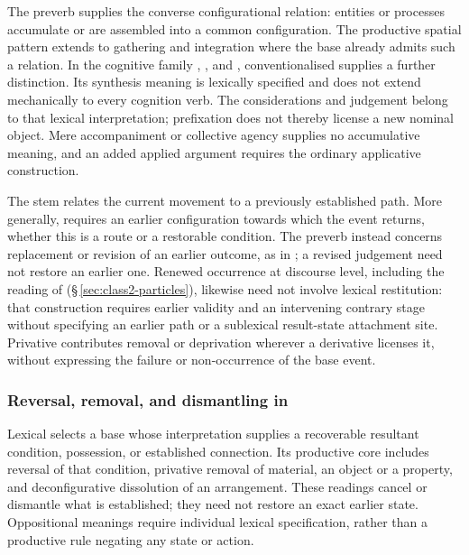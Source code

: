 The preverb  supplies the converse configurational relation: entities
or processes accumulate or are assembled into a common configuration. The productive spatial
pattern extends to gathering and integration where the base already admits
such a relation. In the cognitive family  ,
 , and 
, conventionalised 
 supplies a
further distinction. Its synthesis meaning is lexically specified and does not
extend mechanically to every cognition verb. The considerations and judgement
belong to that lexical interpretation; prefixation does not thereby license a
new nominal object. Mere accompaniment or collective agency supplies no
accumulative meaning, and an added applied argument requires the ordinary
applicative construction.

The stem   relates the current
movement to a previously established path. More generally,  requires an
earlier configuration towards which the event returns, whether this is a route
or a restorable condition. The preverb  instead concerns
replacement or revision of an earlier outcome, as in ; a revised judgement need not
restore an earlier one. Renewed occurrence at discourse level, including the
reading of  (§\,\ref{sec:class2-particles}), likewise need not
involve lexical restitution: that construction requires earlier validity
and an intervening contrary stage without specifying an earlier path or a
sublexical result-state attachment site. Privative  contributes removal or
deprivation wherever a derivative licenses it, without expressing the failure
or non-occurrence of the base event.

\subsubsection{Reversal, removal, and dismantling in }\label{sec:reversative-po}

Lexical  selects a base whose interpretation supplies a recoverable
resultant condition, possession, or established connection. Its productive
core includes reversal of that condition, privative removal of material,
an object or a property, and deconfigurative dissolution of an arrangement.
These readings cancel or dismantle what is established; they need not restore
an exact earlier state. Oppositional meanings require individual lexical
specification, rather than a productive rule negating any state or action.

